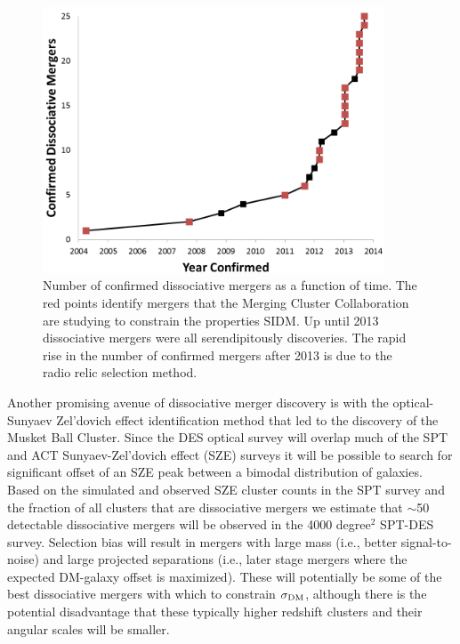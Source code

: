 \begin{figure}
\centering
\includegraphics[width=4in]{Chapter5/NumberOfConfirmedDissociativeMergers.png}
\caption[Number of confirmed dissociative mergers as a function of time.]{
Number of confirmed dissociative mergers as a function of time.
The red points identify mergers that the Merging Cluster Collaboration are studying to  constrain the properties SIDM.
Up until 2013 dissociative mergers were all serendipitously discoveries.
The rapid rise in the number of confirmed mergers after 2013 is due to the radio relic selection method.
}
\label{figure:N_Mergers}
\end{figure}

Another promising avenue of dissociative merger discovery is with the optical-Sunyaev Zel'dovich effect identification method that led to the discovery of the Musket Ball Cluster.
Since the DES optical survey \citep{Collaboration:2005vv} will overlap much of the SPT \citep{Ruhl:2004io} and ACT \citep{Hincks:2010ff} Sunyaev-Zel'dovich effect (SZE) surveys it will be possible to search for significant offset of an SZE peak between a bimodal distribution of galaxies.
Based on the simulated and observed SZE cluster counts in the SPT survey \citep{Vanderlinde:2010hr, Song:2012tz} and the fraction of all clusters that are dissociative mergers \citep{ForeroRomero:2010cc} we estimate that $\sim$50 detectable dissociative mergers will be observed in the 4000 degree$^2$ SPT-DES survey.  Selection bias will result in mergers with large mass (i.e., better signal-to-noise) and large projected separations (i.e., later stage mergers where the expected DM-galaxy offset is maximized).  These will potentially be some of the best dissociative mergers with which to constrain $\sigma_{\rm DM}$, although there is the potential disadvantage that these typically higher redshift clusters and their angular scales will be smaller.


